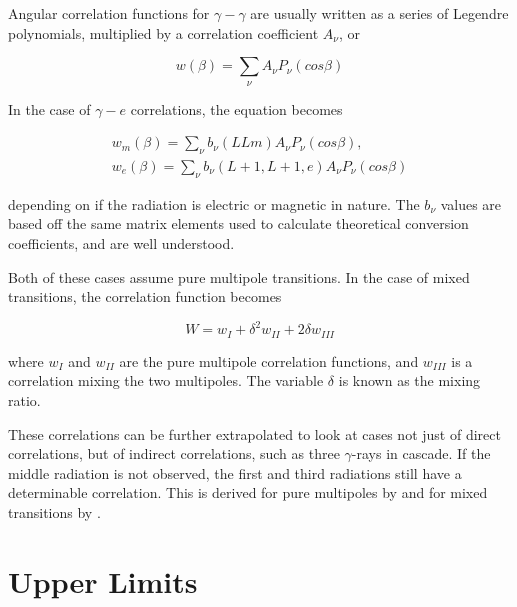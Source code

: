 Angular correlation functions for $\gamma-\gamma$ are usually written as a series of Legendre polynomials, multiplied by a correlation coefficient $A_\nu$, or

\begin{equation}
    w(\beta) = \sum_\nu A_\nu P_\nu(cos\beta)
    \label{eq:ge_corr}
\end{equation}

In the case of $\gamma-e$ correlations, the equation becomes 

\begin{equation}
    \begin{split}
        w_m(\beta) = \sum_\nu b_\nu(LLm) A_\nu P_\nu(cos\beta), \\
        w_e(\beta) = \sum_\nu b_\nu(L+1,L+1,e) A_\nu P_\nu(cos\beta)
        \label{eq:e_corr}
    \end{split}
\end{equation}

depending on if the radiation is electric or magnetic in nature. The $b_\nu$ values are based off the same matrix elements used to calculate theoretical conversion coefficients, and are well understood\citep{rose51:_internal_conversion, rose52:_internal_conversion}.

Both of these cases assume pure multipole transitions. In the case of mixed transitions, the correlation function becomes

\begin{equation}
    W = w_I + \delta^2 w_{II} + 2\delta w_{III}
    \label{eq:mixed_corr}
\end{equation}

where $w_I$ and $w_{II}$ are the pure multipole correlation functions, and $w_{III}$ is a correlation mixing the two multipoles. The variable $\delta$ is known as the mixing ratio. 

These correlations can be further extrapolated to look at cases not just of direct correlations, but of indirect correlations, such as three $\gamma$-rays in cascade. If the middle radiation is not observed, the first and third radiations still have a determinable correlation. This is derived for pure multipoles by \citep{biedenharn53:_theory_angular_corr} and for mixed transitions by \citep{rose53:_angular_corr_supp,osborn53:_angular_corr_3}.

\section{Upper Limits}
\label{sec:upper_limit}

